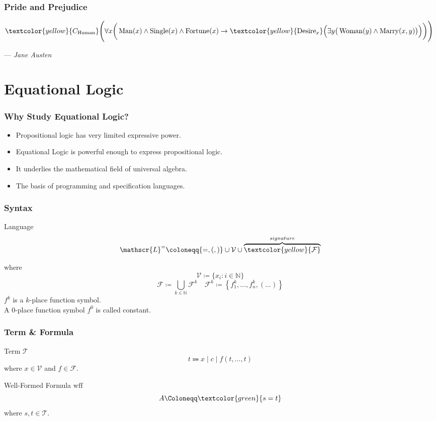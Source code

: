 \documentclass[UTF8,aspectratio=43,11pt,colorlinks,compress,openany]{beamer}%
\begin{document}
\begin{frame}\frametitle{Pride and Prejudice}
$\textcolor{yellow}{C_{\operatorname{Human}}}\Bigg(\forall x\bigg(\operatorname{Man}(x)\wedge \operatorname{Single}(x)\wedge \operatorname{Fortune}(x) \to \textcolor{yellow}{\operatorname{Desire}_x}\Big(\exists y\big(\operatorname{Woman}(y)\wedge \operatorname{Marry}(x,y)\big)\Big)\bigg)\Bigg)$\par\hfill --- \textsl{Jane Austen}
\end{frame}


\section{Equational Logic}


\begin{frame}\frametitle{Why Study Equational Logic?}
	\begin{itemize}
		\item Propositional logic has very limited expressive power.
		\item Equational Logic is powerful enough to express propositional logic.
		\item It underlies the mathematical field of universal algebra.
		\item The basis of programming and specification languages.
	\end{itemize}
\end{frame}

\begin{frame}\frametitle{Syntax}
	\begin{block}{Language}
		\[\mathscr{L}^=\coloneqq \{=,(,)\}\cup\mathcal{V}\cup\overbrace{\textcolor{yellow}{\mathcal{F}}}^{signature}\]
	\end{block}
	where
	\[\mathcal{V}\coloneqq \{x_i: i\in\mathbb{N}\}\]
	\[\mathcal{F}\coloneqq \bigcup\limits_{k\in\mathbb{N}}\mathcal{F}^k\quad \mathcal{F}^k\coloneqq \left\{f_1^k,\dots,f_n^k,(\dots)\right\}\]
	$f^k$ is a $k$-place function symbol.\\
	A $0$-place function symbol $f^0$ is called constant.
\end{frame}

\begin{frame}\frametitle{Term \& Formula}
	\begin{block}{Term $\mathcal{T}$}
		\[t\Coloneqq x\mid c\mid f(t,\dots,t)\]
		where $x\in\mathcal{V}$ and $f\in\mathcal{F}$.
	\end{block}
	\begin{block}{Well-Formed Formula $\mathrm{wff}$}
		\[A\Coloneqq \textcolor{green}{s=t}\]
		where $s,t\in\mathcal{T}$.
	\end{block}
\end{frame}
\end{document}
